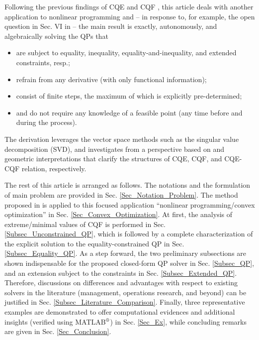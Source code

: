 \documentclass[9pt,twocolumn,twoside,lineno]{pnas-new-1}
\theoremstyle{remark}
\begin{document}
Following the previous findings of CQE and CQF \citep{LiLiHs:20}, this article deals with another application to nonlinear programming and -- in response to, for example, the open question in Sec. VI in \cite{DuJoWaWi:15} -- the main result is exactly, autonomously, and algebraically solving the QPs that
\begin{itemize}
\item are subject to equality, inequality, equality-and-inequality, and extended constraints, resp.;
\item refrain from any derivative (with only functional information);
\item consist of finite steps, the maximum of which is explicitly pre-determined;
\item and do not require any knowledge of a feasible point (any time before and during the process).
\end{itemize}
The derivation leverages the vector space methods such as the singular value decomposition (SVD), and investigates from a perspective based on \cite{LiLiHs:20} and geometric interpretations that clarify the structures of CQE, CQF, and CQE-CQF relation, respectively.

The rest of this article is arranged as follows. The notations and the formulation of main problem are provided in Sec. \ref{Sec_Notation_Problem}. The method proposed in \cite{LiLiHs:20} is applied to this focused application ``nonlinear programming/convex optimization'' in Sec. \ref{Sec_Convex_Optimization}. At first, the analysis of extreme/minimal values of CQF is performed in Sec. \ref{Subsec_Unconstrained_QP}, which is followed by a complete characterization of the explicit solution to the equality-constrained QP in Sec. \ref{Subsec_Equality_QP}. As a step forward, the two preliminary subsections are shown indispensable for the proposed closed-form QP solver in Sec. \ref{Subsec_QP}, and an extension subject to the constraints in Sec. \ref{Subsec_Extended_QP}. Therefore, discussions on differences and advantages with respect to existing solvers in the literature (management, operations research, and beyond) can be justified in Sec. \ref{Subsec_Literature_Comparison}. Finally, three representative examples are demonstrated to offer computational evidences and additional insights (verified using MATLAB$\textsuperscript{\textregistered}$) in Sec. \ref{Sec_Ex}, while concluding remarks are given in Sec. \ref{Sec_Conclusion}.
\end{document}
